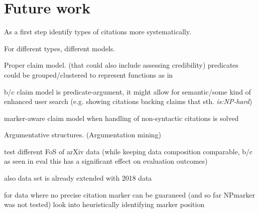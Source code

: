 \chapter{Future work}\label{chap:todo}
As a first step identify types of citations more systematically.

For different types, different models.

Proper claim model. (that could also include assessing credibility\cite{Popat2016})
predicates could be grouped/clustered to represent functions as in \cite{Gabor2018}

b/c claim model is predicate-argument, it might allow for semantic/some kind of enhanced user search (e.g. showing citations backing claims that sth. \emph{is:NP-hard})

marker-aware claim model when handling of non-syntactic citations is solved

Argumentative structures. (Argumentation mining\cite{Stab2016,Lippi2016,Habernal2017})

test different FoS of arXiv data (while keeping data composition comparable, b/c as seen in eval this has a significant effect on evaluation outcomes)

also data set is already extended with 2018 data\cite{Saier2019}

for data where no precise citation marker can be guaraneed (and so far NPmarker was not tested) look into heuristically identifying marker position
